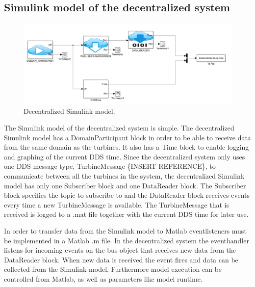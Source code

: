 \subsection{Simulink model of the decentralized system}\label{subsec:decentralizedmodel}

\begin{figure}[b]
\includegraphics[width=\textwidth]{figures/DecentralizedModel}
	\caption[Decentralized Simulink model]{
		\label{fig:decentralizedSimulinkModel} 
		\footnotesize{%
			Decentralized Simulink model.
		}
	}
\end{figure}

The Simulink model of the decentralized system is simple. The decentralized Simulink model has a DomainParticipant block in order to be able to receive data from the same domain as the turbines. It also has a Time block to enable logging and graphing of the current DDS time. Since the decentralized system only uses one DDS message type, TurbineMessage \{INSERT REFERENCE\}, to communicate between all the turbines in the system, the decentralized Simulink model has only one Subscriber block and one DataReader block. The Subscriber block specifies the topic to subscribe to and the DataReader block receives events every time a new TurbineMessage is available. The TurbineMessage that is received is logged to a .mat file together with the current DDS time for later use.

In order to transfer data from the Simulink model to Matlab eventlisteners must be implemented in a Matlab .m file. In the decentralized system the eventhandler listens for incoming events on the bus object that receives new data from the DataReader block. When new data is received the event fires and data can be collected from the Simulink model. Furthermore model execution can be controlled from Matlab, as well as parameters like model runtime.


